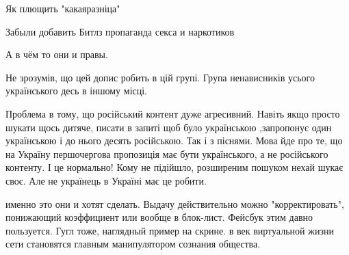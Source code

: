 \begin{itemize}
Як плющить "какаяразніца" \Laughey[1.0][white]\Laughey[1.0][white]\Laughey[1.0][white]

 
Забыли добавить Битлз пропаганда секса и наркотиков

 
А в чём то они и правы.

 
Не зрозумів, що цей допис робить в цій групі. Група ненависників усього українського десь в іншому місці.

 

Проблема в тому, що російський контент дуже агресивний. Навіть якщо просто шукати
щось дитяче, писати в запиті щоб було українською ,запропонує один українською і
до нього десять російською. Так і з піснями. Мова йде про те, що на Україну
першочергова пропозиція має бути українського, а не російського контенту. І це
нормально! Кому не підійшло, розширеним пошуком нехай шукає своє. Але не
українець в Україні має це робити.


 

именно это они и хотят сделать.
Выдачу действительно можно "корректировать", понижающий коэффициент или вообще в блок-лист.
Фейсбук этим давно пользуется. Гугл тоже, наглядный пример на скрине.
в век виртуальной жизни сети становятся главным манипулятором сознания общества.


\end{itemize}
